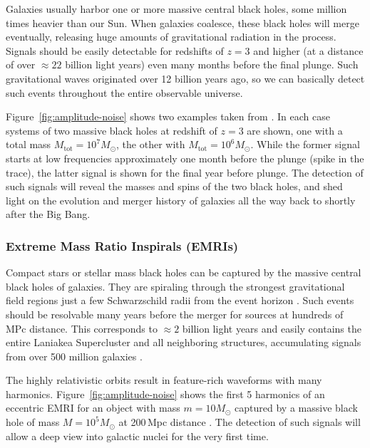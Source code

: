 \documentclass[fleqn,10pt]{<approot>/designer/latexelements/SelfArx} %
\begin{document}
Galaxies usually harbor one or more massive central black holes, some million times heavier than our Sun. When galaxies coalesce, these black holes will merge eventually, releasing huge amounts of gravitational radiation in the process. Signals should be easily detectable for redshifts of $z=3$ and higher (at a distance of over $\approx 22$ billion light years) even many months before the final plunge. Such gravitational waves originated over 12 billion years ago, so we can basically detect such events throughout the entire observable universe.

Figure~\ref{fig:amplitude-noise} shows two examples taken from \cite{antoine}. In each case systems of two massive black holes at redshift of $z=3$ are shown, one with a total mass $M_\text{tot}=10^7 M_{\odot}$, the other with $M_\text{tot}=10^6 M_{\odot}$. While the former signal starts at low frequencies approximately one month before the plunge (spike in the trace), the latter signal is shown for the final year before plunge. The detection of such signals will reveal the masses and spins of the two black holes, and shed light on the evolution and merger history of galaxies all the way back to shortly after the Big Bang.

\subsubsection{Extreme Mass Ratio Inspirals (EMRIs)}

Compact stars or stellar mass black holes can be captured by the massive central black holes of galaxies. They are spiraling through the strongest gravitational field regions just a few Schwarzschild radii from the event horizon \cite{seoane2013gravitational}. Such events should be resolvable many years before the merger for sources at hundreds of MPc distance. This corresponds to $\approx 2$ billion light years and easily contains the entire Laniakea Supercluster and all neighboring structures, accumulating signals from over 500 million galaxies \cite{powell2006atlas}.

The highly relativistic orbits result in feature-rich waveforms with many harmonics. Figure~\ref{fig:amplitude-noise} shows the first 5 harmonics of an eccentric EMRI for an object with mass $m=10 M_{\odot}$ captured by a massive black hole of mass $M=10^5 M_{\odot}$ at 200\,Mpc distance \cite{alberto}. The detection of such signals will allow a deep view into galactic nuclei for the very first time.
\end{document}

